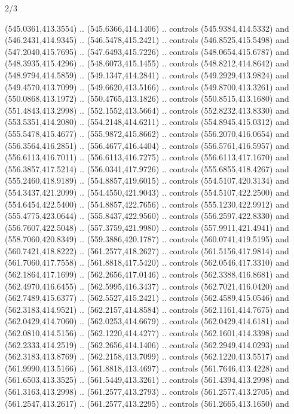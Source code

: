 \begin{flagdescription}{2/3}
\begin{scope}[xshift=0.5\flaglength,yshift=0.5\flagwidth,scale=\flagwidth/495.65]
\begin{scope}[y=0.8pt, x=0.8pt, yscale=-1,shift={(-463.76,-309.78)}]
  (545.0361,413.3554) .. (545.6366,414.1406) .. controls (545.9384,414.5332) and
  (546.2431,414.9345) .. (546.5478,415.2421) .. controls (546.8525,415.5498) and
  (547.2040,415.7695) .. (547.6493,415.7226) .. controls (548.0654,415.6787) and
  (548.3935,415.4296) .. (548.6073,415.1455) .. controls (548.8212,414.8642) and
  (548.9794,414.5859) .. (549.1347,414.2841) .. controls (549.2929,413.9824) and
  (549.4570,413.7099) .. (549.6620,413.5166) .. controls (549.8700,413.3261) and
  (550.0868,413.1972) .. (550.4765,413.1826) .. controls (550.8515,413.1680) and
  (551.4843,413.2998) .. (552.1552,413.5664) .. controls (552.8232,413.8330) and
  (553.5351,414.2080) .. (554.2148,414.6211) .. controls (554.8945,415.0312) and
  (555.5478,415.4677) .. (555.9872,415.8662) .. controls (556.2070,416.0654) and
  (556.3564,416.2851) .. (556.4677,416.4404) .. controls (556.5761,416.5957) and
  (556.6113,416.7011) .. (556.6113,416.7275) .. controls (556.6113,417.1670) and
  (556.3857,417.5214) .. (556.0341,417.9726) .. controls (555.6855,418.4267) and
  (555.2460,418.9189) .. (554.8857,419.6015) .. controls (554.5107,420.3134) and
  (554.3437,421.2099) .. (554.4550,421.9043) .. controls (554.5107,422.2500) and
  (554.6454,422.5400) .. (554.8857,422.7656) .. controls (555.1230,422.9912) and
  (555.4775,423.0644) .. (555.8437,422.9560) .. controls (556.2597,422.8330) and
  (556.7607,422.5048) .. (557.3759,421.9980) .. controls (557.9911,421.4941) and
  (558.7060,420.8349) .. (559.3886,420.1787) .. controls (560.0741,419.5195) and
  (560.7421,418.8222) .. (561.2577,418.2627) .. controls (561.5156,417.9814) and
  (561.7060,417.7558) .. (561.8818,417.5420) .. controls (562.0546,417.3310) and
  (562.1864,417.1699) .. (562.2656,417.0146) .. controls (562.3388,416.8681) and
  (562.4970,416.6455) .. (562.5995,416.3437) .. controls (562.7021,416.0420) and
  (562.7489,415.6377) .. (562.5527,415.2421) .. controls (562.4589,415.0546) and
  (562.3183,414.9521) .. (562.2157,414.8584) .. controls (562.1161,414.7675) and
  (562.0429,414.7060) .. (562.0253,414.6679) .. controls (562.0429,414.6181) and
  (562.0810,414.5156) .. (562.1220,414.4277) .. controls (562.1601,414.3398) and
  (562.2333,414.2519) .. (562.2656,414.1406) .. controls (562.2949,414.0293) and
  (562.3183,413.8769) .. (562.2158,413.7099) .. controls (562.1220,413.5517) and
  (561.9990,413.5166) .. (561.8818,413.4697) .. controls (561.7646,413.4228) and
  (561.6503,413.3525) .. (561.5449,413.3261) .. controls (561.4394,413.2998) and
  (561.3163,413.2998) .. (561.2577,413.2793) .. controls (561.2577,413.2705) and
  (561.2547,413.2617) .. (561.2577,413.2295) .. controls (561.2665,413.1650) and

\end{scope}
\end{scope}
\end{flagdescription}
